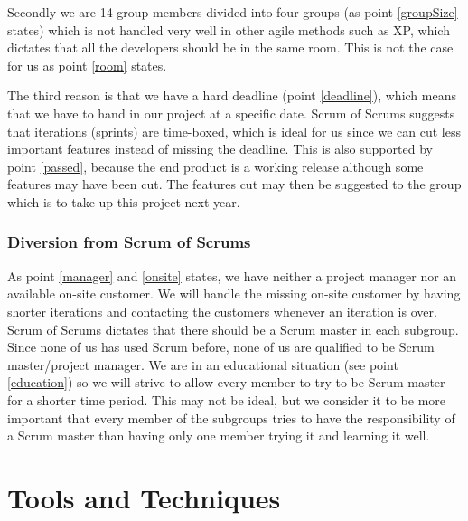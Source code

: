 \documentclass{article}
\begin{document}
Secondly we are 14 group members divided into four groups (as point \ref{groupSize} states) which is not handled very well in other agile methods such as XP, which dictates that all the developers should be in the same room. 
This is not the case for us as point \ref{room} states.

The third reason is that we have a hard deadline (point \ref{deadline}), which means that we have to hand in our project at a specific date.
Scrum of Scrums suggests that iterations (sprints) are time-boxed, which is ideal for us since we can cut less important features instead of missing the deadline.
This is also supported by point \ref{passed}, because the end product is a working release although some features may have been cut.
The features cut may then be suggested to the group which is to take up this project next year.



\subsubsection{Diversion from Scrum of Scrums}
As point \ref{manager} and \ref{onsite} states, we have neither a project manager nor an available on-site customer.
We will handle the missing on-site customer by having shorter iterations and contacting the customers whenever an iteration is over.
Scrum of Scrums dictates that there should be a Scrum master in each subgroup.
Since none of us has used Scrum before, none of us are qualified to be Scrum master/project manager.
We are in an educational situation (see point \ref{education}) so we will strive to allow every member to try to be Scrum master for a shorter time period.
This may not be ideal, but we consider it to be more important that every member of the subgroups tries to have the responsibility of a Scrum master than having only one member trying it and learning it well.





\section{Tools and Techniques}
\end{document}
